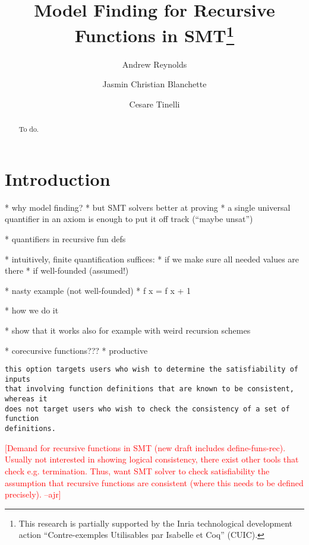 \documentclass[runningheads,a4paper]{llncs}
\newcommand{\rem}[1]{\textcolor{red}{[#1]}}
\newcommand{\ajr}[1]{\rem{#1 --ajr}}
\begin{document}
\title{Model Finding for Recursive Functions in SMT\thanks{%
This research is partially supported by the Inria technological development
action ``Contre-exemples Utilisables par Isabelle et Coq'' (CUIC).
}
}

\author {Andrew Reynolds \and Jasmin Christian Blanchette \and Cesare Tinelli }

\maketitle

\begin{abstract}
To do.
\end{abstract}

\section{Introduction}
\label{sec:introduction}

  * why model finding?
  * but SMT solvers better at proving
    * a single universal quantifier in an axiom is enough to put it off track
      (``maybe unsat'')

  * quantifiers in recursive fun defs

  * intuitively, finite quantification suffices:
    * if we make sure all needed values are there
    * if well-founded (assumed!)

  * nasty example (not well-founded)
    * f x = f x + 1

  * how we do it

  * show that it works also for example with weird recursion schemes

  * corecursive functions???
    * productive

\begin{verbatim}
this option targets users who wish to determine the satisfiability of inputs
that involving function definitions that are known to be consistent, whereas it
does not target users who wish to check the consistency of a set of function
definitions.
\end{verbatim}


\ajr{Demand for recursive functions in SMT (new draft includes
define-funs-rec). Usually not interested in showing logical consistency, there
exist other tools that check e.g. termination.
Thus, want SMT solver to check satisfiability the assumption that recursive
functions are consistent (where this needs to be defined precisely).
}
\end{document}
